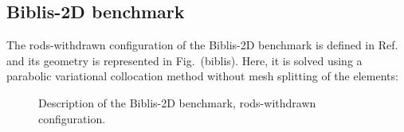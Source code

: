 \subsection{Biblis-2D benchmark}

The rods-withdrawn configuration of the Biblis-2D benchmark is defined in Ref.~ and its geometry is represented in Fig.~\fig(biblis). Here, it is solved using a parabolic variational collocation method without mesh splitting of the elements:

\begin{figure}[htbp]
\begin{center} 
\epsfxsize=8.0cm
\centerline{ }
\parbox{14cm}{\caption{Description of the Biblis-2D benchmark, rods-withdrawn configuration.}\label{fig:biblis}}  \end{center} 
\end{figure}

